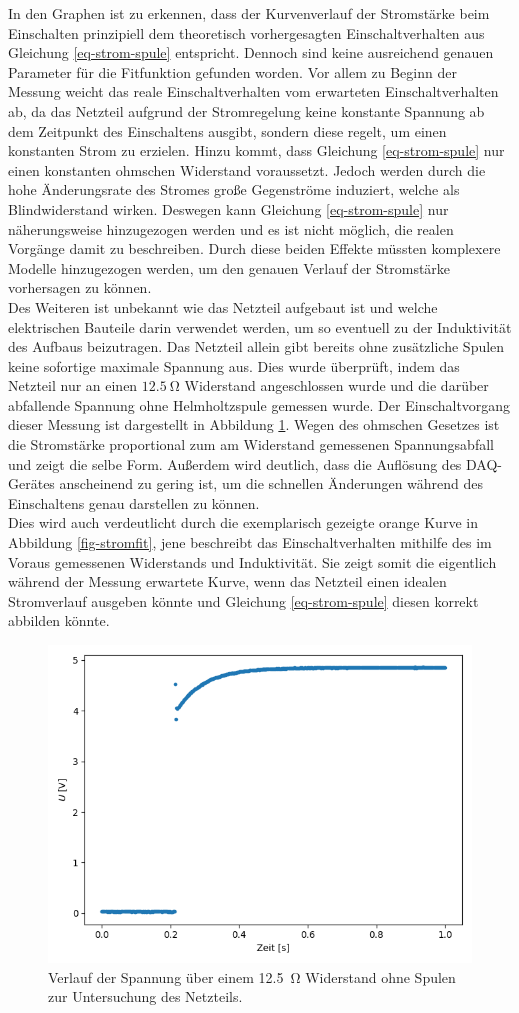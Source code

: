 \documentclass[page,pdftex,12pt,a4paper,twoside,openright]{scrbook}
\begin{document}
In den Graphen ist zu erkennen, dass der Kurvenverlauf der Stromstärke beim Einschalten prinzipiell dem theoretisch vorhergesagten Einschaltverhalten aus Gleichung \ref{eq-strom-spule} entspricht. Dennoch sind keine ausreichend genauen Parameter für die Fitfunktion gefunden worden. Vor allem zu Beginn der Messung weicht das reale Einschaltverhalten vom erwarteten Einschaltverhalten ab, da das Netzteil aufgrund der Stromregelung keine konstante Spannung ab dem Zeitpunkt des Einschaltens ausgibt, sondern diese regelt, um einen konstanten Strom zu erzielen. Hinzu kommt, dass Gleichung \ref{eq-strom-spule} nur einen konstanten ohmschen Widerstand voraussetzt. Jedoch werden durch die hohe Änderungsrate des Stromes große Gegenströme induziert, welche als Blindwiderstand wirken. Deswegen kann Gleichung \ref{eq-strom-spule} nur näherungsweise hinzugezogen werden und es ist nicht möglich, die realen Vorgänge damit zu beschreiben. Durch diese beiden Effekte müssten komplexere Modelle hinzugezogen werden, um den genauen Verlauf der Stromstärke vorhersagen zu können.\\
Des Weiteren ist unbekannt wie das Netzteil aufgebaut ist und welche elektrischen Bauteile darin verwendet werden, um so eventuell zu der Induktivität des Aufbaus beizutragen. Das Netzteil allein gibt bereits ohne zusätzliche Spulen keine sofortige maximale Spannung aus. Dies wurde überprüft, indem das Netzteil nur an einen \(\SI{12.5}{\ohm}\) Widerstand angeschlossen wurde und die darüber abfallende Spannung ohne Helmholtzspule gemessen wurde. Der Einschaltvorgang dieser Messung ist dargestellt in Abbildung \ref{fig-12ohm}. Wegen des ohmschen Gesetzes ist die Stromstärke proportional zum am Widerstand gemessenen Spannungsabfall und zeigt die selbe Form. Außerdem wird deutlich, dass die Auflösung des DAQ-Gerätes anscheinend zu gering ist, um die schnellen Änderungen während des Einschaltens genau darstellen zu können.\\
Dies wird auch verdeutlicht durch die exemplarisch gezeigte orange Kurve in Abbildung \ref{fig-stromfit}, jene beschreibt das Einschaltverhalten mithilfe des im Voraus gemessenen Widerstands und Induktivität. Sie zeigt somit die eigentlich während der Messung erwartete Kurve, wenn das Netzteil einen idealen Stromverlauf ausgeben könnte und Gleichung \ref{eq-strom-spule} diesen korrekt abbilden könnte.\\

\begin{figure}[h]
\centering
\includegraphics[width=.5\textwidth]{img/12,5ohm.png}
\caption{\label{fig-12ohm}
Verlauf der Spannung über einem \SI{12.5}{\ohm} Widerstand ohne Spulen zur Untersuchung des Netzteils.}
\end{figure}
\end{document}
